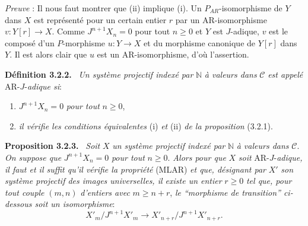 \documentclass[11pt]{article}
\providecommand{\NN}{\mathbb{N}}
\newenvironment{statement}[1]{\par\medskip\noindent\textbf{#1.}\ }{\par\medskip}
\providecommand{\NN}{\mathbb N}
\providecommand{\cC}{\mathcal C}
\providecommand{\cC}{\mathcal C}
\begin{document}
\emph{Preuve} : Il nous faut montrer que (ii) implique (i). Un $P_{AR}$-isomorphisme de $Y$ dans $X$ est représenté pour un certain entier $r$ par un AR-isomorphisme $v:Y[r]\to X$. Comme $J^{n+1}X_n=0$ pour tout $n\ge0$ et $Y$ est $J$-adique, $v$ est le composé d'un $P$-morphisme $u:Y\to X$ et du morphisme canonique de $Y[r]$ dans $Y$. Il est alors clair que $u$ est un AR-isomorphisme, d'où l'assertion.

\begin{statement}{Définition 3.2.2}
\emph{Un système projectif indexé par} $\NN$ \emph{à valeurs dans} $\cC$ \emph{est appelé} AR-$J$-\emph{adique si}:
\begin{enumerate}[label=(\alph*)]
\item $J^{n+1}X_n=0$ \emph{pour tout} $n\ge0$,
\item \emph{il vérifie les conditions équivalentes} (i) \emph{et} (ii) \emph{de la proposition} (3.2.1).
\end{enumerate}
\end{statement}

\begin{statement}{Proposition 3.2.3}
\emph{Soit} $X$ \emph{un système projectif indexé par} $\NN$ \emph{à valeurs dans} $\cC$. \emph{On suppose que} $J^{n+1}X_n=0$ \emph{pour tout} $n\ge0$. \emph{Alors pour que} $X$ \emph{soit} AR-$J$-\emph{adique, il faut et il suffit qu'il vérifie la propriété} (MLAR) \emph{et que, désignant par} $X'$ \emph{son système projectif des images universelles, il existe un entier} $r\ge0$ \emph{tel que, pour tout couple} $(m,n)$ \emph{d'entiers avec} $m\ge n+r$, \emph{le ``morphisme de transition'' ci-dessous soit un isomorphisme}:
\[
X'_m/J^{n+1}X'_m\longrightarrow X'_{n+r}/J^{n+1}X'_{n+r}.
\]
\end{statement}
\end{document}
